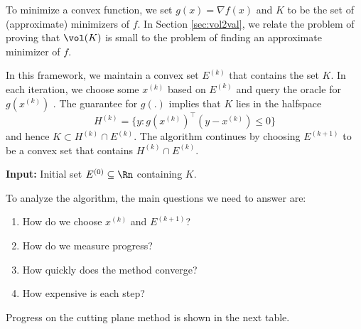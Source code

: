 \begin{rem*}
To minimize a convex function, we set $g(x)=\nabla f(x)$ and $K$
to be the set of (approximate) minimizers of $f$. In Section \ref{sec:vol2val},
we relate the problem of proving that $\vol(K)$ is small to the problem
of finding an approximate minimizer of $f$.
\end{rem*}
In this framework, we maintain a convex set $E^{(k)}$ that contains
the set $K$. In each iteration, we choose some $x^{(k)}$ based on
$E^{(k)}$ and query the oracle for $g(x^{(k)})$ . The guarantee
for $g(.)$ implies that $K$ lies in the halfspace 
\[
H^{(k)}=\{y:g(x^{(k)})^{\top}(y-x^{(k)})\leq0\}
\]
 and hence $K\subset H^{(k)}\cap E^{(k)}.$ The algorithm continues
by choosing $E^{(k+1)}$ to be a convex set that contains $H^{(k)}\cap E^{(k)}$. 

\begin{algorithm2e}[H]

\caption{$\mathtt{CuttingPlaneFramework}$}\label{alg:cutting_plane}

\SetAlgoLined

\textbf{Input:} Initial set $E^{(0)}\subseteq\Rn$ containing $K$.


\end{algorithm2e}

To analyze the algorithm, the main questions we need to answer are:
\begin{enumerate}
\item How do we choose $x^{(k)}$ and $E^{(k+1)}$?
\item How do we measure progress?
\item How quickly does the method converge?
\item How expensive is each step?
\end{enumerate}
Progress on the cutting plane method is shown in the next table.

